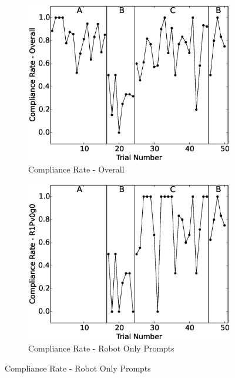 \begin{figure}[h]
	\centering
	\begin{subfigure}[b]{0.49\textwidth}
		\includegraphics[width=1.1\linewidth]{./img/data_analysis/102ComplianceRate-Overall.eps}
		\caption{Compliance Rate - Overall}
		\label{fig:102ComplianceRate-Overall}
	\end{subfigure}
	\hfill
	\begin{subfigure}[b]{0.49\textwidth}
		\includegraphics[width=1.1\linewidth]{./img/data_analysis/79ComplianceRate-R1Pv0g0.eps}
		\caption{Compliance Rate - Robot Only Prompts}
		\label{fig:79ComplianceRate-R1Pv0g0}
	\end{subfigure}%
	

\end{figure}
